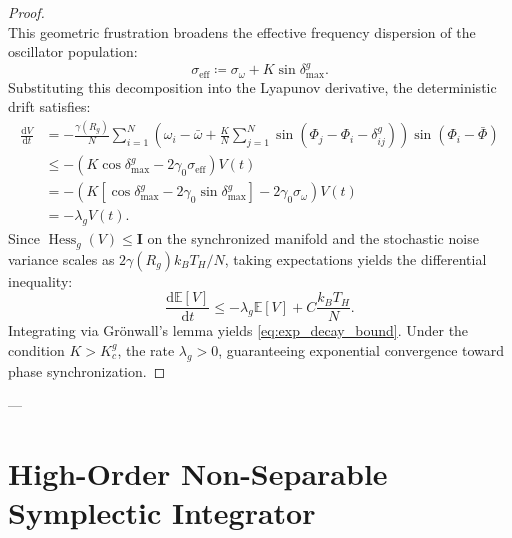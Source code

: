 \documentclass[11pt,a4paper,reqno]{article}
\theoremstyle{plain}
\theoremstyle{definition}
\theoremstyle{remark}
\numberwithin{equation}{section}
\begin{document}
\begin{proof}
\begin{equation}
\end{equation}
This geometric frustration broadens the effective frequency dispersion of the oscillator population:
\begin{equation}
\sigma_{\mathrm{eff}} \coloneqq \sigma_\omega + K \sin \delta_{\max}^g.
\end{equation}
Substituting this decomposition into the Lyapunov derivative, the deterministic drift satisfies:
\begin{align}
\frac{\mathrm{d}V}{\mathrm{d}t} &= -\frac{\gamma(R_g)}{N} \sum_{i=1}^N \left( \omega_i - \bar{\omega} + \frac{K}{N} \sum_{j=1}^N \sin(\Phi_j - \Phi_i - \delta_{ij}^g) \right) \sin(\Phi_i - \bar{\Phi}) \nonumber \\
&\le -\left( K \cos \delta_{\max}^g - 2 \gamma_0 \sigma_{\mathrm{eff}} \right) V(t) \nonumber \\
&= -\left( K \left[ \cos \delta_{\max}^g - 2 \gamma_0 \sin \delta_{\max}^g \right] - 2 \gamma_0 \sigma_\omega \right) V(t) \nonumber \\
&= -\lambda_g V(t).
\end{align}
Since $\operatorname{Hess}_g(V) \le \bm{I}$ on the synchronized manifold and the stochastic noise variance scales as $2 \gamma(R_g) k_B T_H / N$, taking expectations yields the differential inequality:
\begin{equation}
\frac{\mathrm{d}\mathbb{E}[V]}{\mathrm{d}t} \le -\lambda_g \mathbb{E}[V] + C \frac{k_B T_H}{N}.
\end{equation}
Integrating via Gr\"onwall's lemma yields \eqref{eq:exp_decay_bound}. Under the condition $K > K_c^g$, the rate $\lambda_g > 0$, guaranteeing exponential convergence toward phase synchronization.
\end{proof}

---

\section{High-Order Non-Separable Symplectic Integrator}
\end{document}
